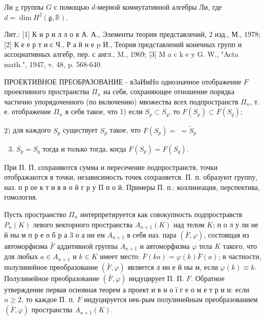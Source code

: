 \documentclass[10pt]{article}
\begin{document}
Ли g группы $G$ с помощью $d$-мерной коммутативной алгебры Ли, где $d=\operatorname{dim} H^{2}(\mathfrak{g}, \mathbb{R})$.



Лит.: [1] К и р и л л о в А. А., Элементы теории представлений, 2 изд., М., 1978; [2] К е е р т и с Ч., Р а й н е p И., Теория представлений конечных групп и ассоциативных алгебр, пер. с англ., M., 1969; [3] M a c k e y G. W., "Acta math.", 1947, v. 48, p. 568-640.



ПРОЕКТИВНОЕ ПРЕОБРАЗОВАНИЕ - вЗаИмНо однозначное отображение $F$ проективного пространства $\Pi_{n}$ на себя, сохраняющее отношение порядка частично упорядоченного (по включению) мвожества всех подпространств $\Pi_{n}$, т. е. отображение $\Pi_{n}$ в себя такое, что 1) если $S_{p} \subset S_{q}$, то $F\left(S_{p}\right) \subset F\left(S_{q}\right)$;



$2)$ для каждого $S_{p}$ существует $S_{p}$ такое, что $F\left(S_{p}\right)=$ $=\tilde{S}_{p}$



\begin{enumerate}

  \setcounter{enumi}{2}

  \item $S_{p}=S_{q}$ тогда и только тогда, когда $F\left(S_{p}\right)=F\left(S_{q}\right)$.

\end{enumerate}



При П. П. сохраняются сумма и пересечение подпространств, точки отображаются в точки, независимость точек сохраняется. П. п. образуют группу, наз. п р ое к т и в в о й г р у П п о й. Примеры П. п.: коллинеация, перспектива, гомология.



Пусть пространство $\Pi_{n}$ интерпретируется как совокупность подпростравств $P_{n}(K)$ левого векторного пространства $A_{n+1}(K)$ над телом $K$; п о л у ли не й ны м п р е о б р а 3 о а ни ем $A_{n+1}$ в себя наз. пара $(\bar{F}, \varphi)$, состоящая из автоморфизма $\bar{F}$ аддитивной группы $A_{n+1}$ и автоморфизма $\varphi$ тела $K$ такого, что для любых $a \in A_{n+1}$ и $k \in K$ имеет место: $\bar{F}(k a)=\varphi(k) \bar{F}(a)$; в частности, полулинейное преобразование $(\bar{F}, \varphi)$ является л ин е й ны м, если $\varphi(k) \equiv k$. Полулинейное преобразование $(\bar{F}, \varphi)$ индуцирует П. П. $F$. Обратное утверждение первая основная теорем а проект и в н о ї г е о м е т р и и: если $n \geqslant 2$, то каждое П. п. $F$ индуцируется нек-рым полулинейным преобразованием $(\bar{F}, \varphi)$ пространства $A_{n+1}(K)$.
\end{document}
